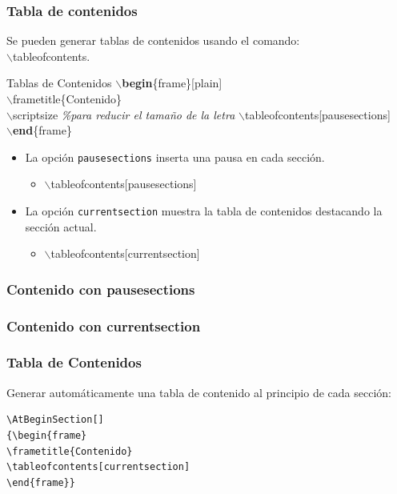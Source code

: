 \documentclass[aspectratio=1610]{beamer}%
\newcommand\azul[1]{\textcolor[RGB]{19,15,204}{#1}}
\begin{document}
\begin{frame}[fragile]
\frametitle{\textbf{Tabla de contenidos}}
\justifying
 
 Se pueden generar tablas de contenidos usando el comando:\\ $\backslash$tableofcontents.
 \begin{exampleblock}{Tablas de Contenidos}
$\backslash$\textbf{begin}\{frame\}[plain]\\
$\backslash$frametitle\{Contenido\}\\
$\backslash$scriptsize \textit{\%para reducir el tama\~no de la letra}
$\backslash$\azul{tableofcontents}[pausesections]\\
$\backslash$\textbf{end}\{frame\}\\
\end{exampleblock}

\begin{itemize}\justifying
  \item La opción \texttt{pausesections} inserta una pausa en cada sección.
  \begin{itemize}\justifying
  \item []$\backslash$\azul{tableofcontents}[pausesections]
\end{itemize}

  \item La opción \texttt{currentsection} muestra la tabla de contenidos destacando la sección actual.
  \begin{itemize}\justifying
  \item []$\backslash$\azul{tableofcontents}[currentsection]\
\end{itemize}

\end{itemize}

 
\end{frame}

\begin{frame}[plain]
\frametitle{\textbf{Contenido con pausesections}}
\justifying
\scriptsize
 \tableofcontents[pausesections]
\end{frame}

\begin{frame}[plain]
\frametitle{\textbf{Contenido con currentsection}}
\justifying\scriptsize

 \tableofcontents[currentsection]
\end{frame}

\begin{frame}[fragile]
\frametitle{\textbf{Tabla de Contenidos}}
\justifying
 Generar automáticamente una tabla de contenido al principio de cada sección:
\begin{block}{}
   \lstset{language=TEX}%
   \vspace{-0.7cm}
\begin{lstlisting}
\AtBeginSection[]
{\begin{frame}
\frametitle{Contenido}
\tableofcontents[currentsection]
\end{frame}}
\end{lstlisting}\vspace{-0.3cm}
\end{block}

\end{frame}
\end{document}
